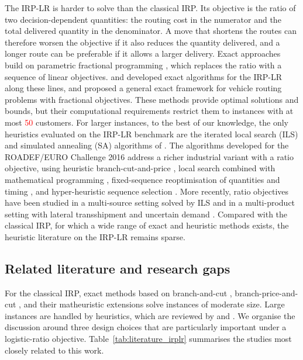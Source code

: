 The IRP-LR is harder to solve than the classical IRP. Its objective is the
ratio of two decision-dependent quantities: the routing cost in the numerator
and the total delivered quantity in the denominator. A move that shortens the
routes can therefore worsen the objective if it also reduces the quantity
delivered, and a longer route can be preferable if it allows a larger
delivery. Exact approaches build on parametric fractional programming
\citep{dinkelbach1967}, which replaces the ratio with a sequence of linear
objectives. \citet{archetti2017logistic} and \citet{archetti2019exact}
developed exact algorithms for the IRP-LR along these lines, and
\citet{baldacci2020fractional} proposed a general exact framework for vehicle
routing problems with fractional objectives. These methods provide optimal
solutions and bounds, but their computational requirements restrict them to
instances with at most \textcolor{red}{50} customers. For larger instances, to the best of our
knowledge, the only heuristics evaluated on the IRP-LR benchmark are the
iterated local search (ILS) and simulated annealing (SA) algorithms of
\citet{alvarez2018iterated}. The algorithms developed for the ROADEF/EURO
Challenge 2016 address a richer industrial variant with a ratio objective,
using heuristic branch-cut-and-price \citep{absi2020branch}, local search
combined with mathematical programming \citep{su2020matheuristic},
fixed-sequence reoptimisation of quantities and timing
\citep{he2020fixedsequence}, and hyper-heuristic sequence selection
\citep{kheiri2020heuristic}. More recently, ratio objectives have been
studied in a multi-source setting solved by ILS \citep{alonsopecina2024iterated}
and in a multi-product setting with lateral transshipment and uncertain
demand \citep{man2025logistics}. Compared with the classical IRP, for which
a wide range of exact and heuristic methods exists, the heuristic literature
on the IRP-LR remains sparse.

\subsection{Related literature and research gaps}
\label{sec:intro_literature}

For the classical IRP, exact methods based on branch-and-cut
\citep{archetti2007branch,coelho2013branch}, branch-price-and-cut
\citep{desaulniers2016branch}, and their matheuristic extensions
\citep{skaalnes2023branch} solve instances of moderate size. Large instances
are handled by heuristics, which are reviewed by \citet{sofianopoulou2021review}
and \citet{ekcsi2026inventory}. We organise the discussion around three
design choices that are particularly important under a logistic-ratio
objective. Table~\ref{tab:literature_irplr} summarises the studies most
closely related to this work.

